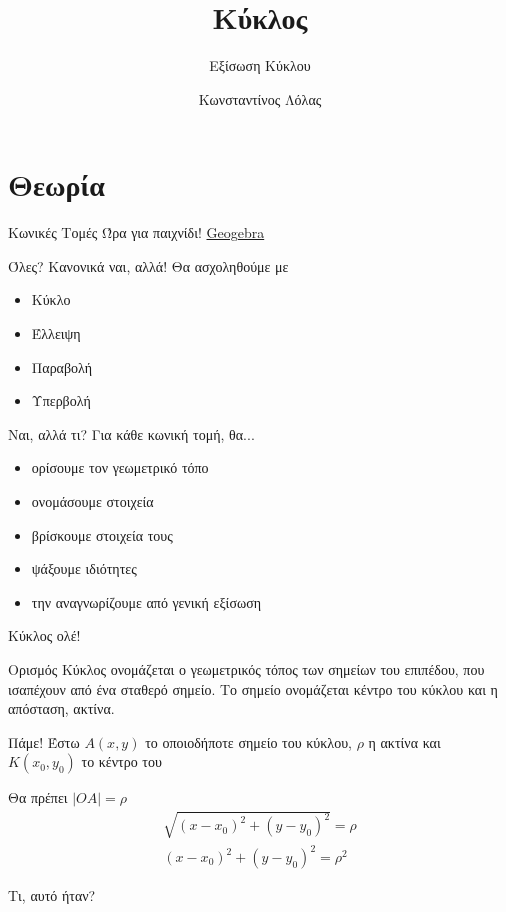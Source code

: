 \documentclass{../../presentation}
\title{Κύκλος}
\subtitle{Εξίσωση Κύκλου}
\author[Λόλας]{Κωνσταντίνος Λόλας}
\date{}
\begin{document}
\begin{frame}
  \titlepage
\end{frame}

\section{Θεωρία}
\begin{frame}{Κωνικές Τομές}
  Ώρα για παιχνίδι!
  \href{https://www.geogebra.org/m/pCg8NFVT}{Geogebra}
\end{frame}

\begin{frame}{Όλες? Κανονικά ναι, αλλά!}
  Θα ασχοληθούμε με
  \begin{itemize}
    \item Κύκλο
    \item Έλλειψη
    \item Παραβολή
    \item Υπερβολή
  \end{itemize}
\end{frame}

\begin{frame}{Ναι, αλλά τι?}
  Για κάθε κωνική τομή, θα...
  \begin{itemize}
    \item<1-> ορίσουμε τον γεωμετρικό τόπο
    \item<2-> ονομάσουμε στοιχεία
    \item<3-> βρίσκουμε στοιχεία τους
    \item<4-> ψάξουμε ιδιότητες
    \item<5-> την αναγνωρίζουμε από γενική εξίσωση
  \end{itemize}
\end{frame}

\begin{frame}{Κύκλος ολέ!}
  \begin{block}{Ορισμός}
    Κύκλος ονομάζεται ο γεωμετρικός τόπος των σημείων του επιπέδου, που ισαπέχουν από ένα σταθερό σημείο. Το σημείο ονομάζεται κέντρο του κύκλου και η απόσταση, ακτίνα.
  \end{block}
\end{frame}

\begin{frame}{Πάμε!}
   Έστω $A(x,y)$ το οποιοδήποτε σημείο του κύκλου, $ρ$ η ακτίνα και $Κ(x_0,y_0)$ το κέντρο του

   Θα πρέπει $|ΟΑ|=ρ$
  \begin{align*}
    \sqrt{(x-x_0)^2+(y-y_0)^2}=ρ \\
    (x-x_0)^2+(y-y_0)^2=ρ^2
  \end{align*}

   Τι, αυτό ήταν?

\end{frame}
\end{document}
